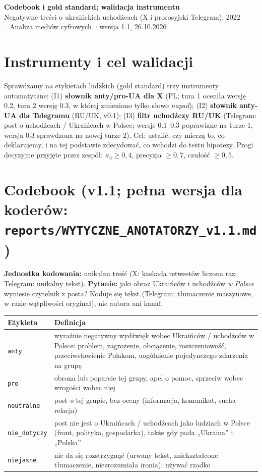 \documentclass[10pt,a4paper]{article}
\begin{document}
\small
\begin{center}
{\large\bfseries Codebook i gold standard; walidacja instrumentu}\\[1pt]
Negatywne treści o ukraińskich uchodźcach (X i prorosyjski Telegram), 2022 \quad·\quad Analiza mediów cyfrowych \quad·\quad wersja 1.1, 26.10.2026
\end{center}

\section{Instrumenty i cel walidacji}
Sprawdzamy na etykietach ludzkich (gold standard) trzy instrumenty automatyczne: (I1) \textbf{słownik anty/pro-UA dla X} (PL; tura 1 oceniła wersję 0.2, tura 2 wersję 0.3, w której zmieniono tylko słowo \emph{napad});
(I2) \textbf{słownik anty-UA dla Telegramu} (RU/UK, v0.1);
(I3) \textbf{filtr uchodźczy RU/UK} (Telegram: post o uchodźcach / Ukraińcach w Polsce; wersje 0.1--0.3 poprawiane na turze 1, wersja 0.3 sprawdzona na nowej turze 2).
Cel: ustalić, czy mierzą to, co deklarujemy, i na tej podstawie zdecydować, co wchodzi do testu hipotezy. Progi decyzyjne przyjęte przez zespół: $\kappa_3\ge 0{,}4$, precyzja $\ge 0{,}7$, czułość $\ge 0{,}5$.

\section{Codebook (v1.1; pełna wersja dla koderów: \texttt{reports/WYTYCZNE\_ANOTATORZY\_v1.1.md})}
\textbf{Jednostka kodowania:} unikalna treść (X: kaskada retweetów liczona raz; Telegram: unikalny tekst). \textbf{Pytanie:} jaki obraz Ukraińców i uchodźców \emph{w Polsce} wyniesie czytelnik z posta? Koduje się tekst (Telegram: tłumaczenie maszynowe, w razie wątpliwości oryginał), nie autora ani kanał.

\begin{tabularx}{\linewidth}{@{}lX@{}}
\toprule
Etykieta & Definicja \\
\midrule
\texttt{anty} & wyraźnie negatywny wydźwięk wobec Ukraińców / uchodźców w Polsce: problem, zagrożenie, obciążenie, roszczeniowość, przeciwstawienie Polakom, uogólnienie pojedynczego zdarzenia na grupę \\
\texttt{pro} & obrona lub poparcie tej grupy, apel o pomoc, sprzeciw wobec wrogości wobec niej \\
\texttt{neutralne} & post \emph{o} tej grupie, bez oceny (informacja, komunikat, sucha relacja) \\
\texttt{nie\_dotyczy} & post nie jest o Ukraińcach / uchodźcach jako ludziach w Polsce (front, polityka, gospodarka), także gdy pada „Ukraina” i „Polska” \\
\texttt{niejasne} & nie da się rozstrzygnąć (urwany tekst, zniekształcone tłumaczenie, niezrozumiała ironia); używać rzadko \\
\bottomrule
\end{tabularx}
\end{document}
